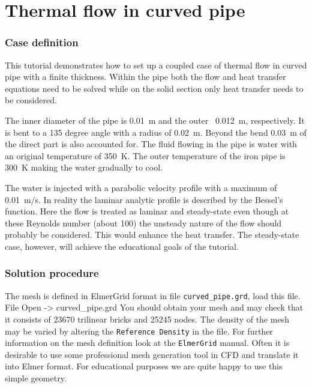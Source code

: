 \chapter{Thermal flow in curved pipe}



\subsection*{Case definition}
 

This tutorial demonstrates how to set up a coupled case
of thermal flow in curved pipe with a finite thickness. Within the pipe 
both the flow and heat transfer equations need to be solved while on the
solid section only heat transfer needs to be considered. 

The inner diameter of the pipe is 0.01~m and the outer ~0.012~m, respectively. 
It is bent to a 135 degree angle with a radius of 0.02~m. Beyond the bend
0.03~m of the direct part is also accounted for. 
The fluid flowing in the pipe is water with an original temperature of 350~K. 
The outer temperature of the iron pipe is 300~K making the water
gradually to cool. 

The water is injected with a parabolic velocity profile with a maximum
of 0.01~m/s. In reality the laminar analytic profile is described by the 
Bessel's function. Here the flow is treated as laminar and steady-state 
even though at these Reynolds number (about 100) the unsteady nature of the 
flow should probably be considered. This would enhance the heat transfer.
The steady-state case, however, will achieve the educational goals of the tutorial.

\subsection*{Solution procedure}

The mesh is defined in ElmerGrid format in file \texttt{curved\_pipe.grd}, load this file.
\ttbegin
File 
  Open -> curved\_pipe.grd
\ttend
You should obtain your mesh and may check that it consists of 23670 trilinear 
bricks and 25245 nodes. The density of the mesh may be varied by altering
the \texttt{Reference Density} in the file. For further information on
the mesh definition look at the \texttt{ElmerGrid} manual. Often it is 
desirable to use some professional mesh generation tool in CFD and 
translate it into Elmer format. For educational purposes we are 
quite happy to use this simple geometry.  

